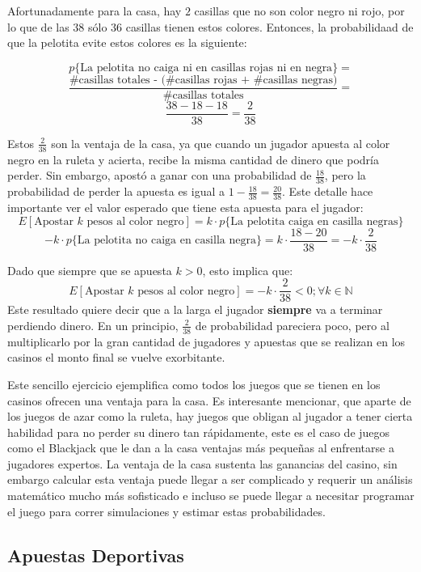 Afortunadamente para la casa, hay $2$ casillas que no son color negro ni rojo, por lo que de las $38$ sólo $36$ casillas tienen estos colores. Entonces, la probabilidaad de que la pelotita evite estos colores es la siguiente:

\[p\{\text{La pelotita no caiga ni en casillas rojas ni en negra}\} =\] 
\[\frac{\text{\# casillas totales - (\# casillas rojas + \# casillas negras)}}{ \text{\# casillas totales}}  =\]
\[\frac{38-18-18}{38} = \frac{2}{38}  \]

Estos $\frac{2}{38}$ son la ventaja de la casa, ya que cuando un jugador apuesta al color negro en la ruleta y acierta, recibe la misma cantidad de dinero que podría perder. Sin embargo, apostó a ganar con una probabilidad de $\frac{18}{38}$, pero la probabilidad de perder la apuesta es igual a $1 - \frac{18}{38} = \frac{20}{38}$. Este detalle hace importante ver el valor esperado que tiene esta apuesta para el jugador:
\[E[\text{Apostar }k\text{ pesos al color negro}] = k  \cdot   p\{\text{La pelotita caiga en casilla negras}\} \]
\[- k  \cdot   p\{\text{La pelotita no caiga en casilla negra}\} = k \cdot \frac{18-20}{38}= - k \cdot \frac{2}{38}\]

Dado que siempre que se apuesta $k>0$, esto implica que:
\[E[\text{Apostar }k\text{ pesos al color negro}] = - k \cdot \frac{2}{38} < 0; \forall k \in \mathbb{N} \]
Este resultado quiere decir que a la larga el jugador \textbf{siempre} va a terminar perdiendo dinero.
En un principio, $\frac{2}{38}$ de probabilidad pareciera poco, pero al multiplicarlo por la gran cantidad de jugadores y apuestas que se realizan en los casinos el monto final se vuelve exorbitante.

Este sencillo ejercicio ejemplifica como todos los juegos que se tienen en los casinos ofrecen una ventaja para la casa. Es interesante mencionar, que aparte de los juegos de azar como la ruleta, hay juegos que obligan al jugador a tener cierta habilidad para no perder su dinero tan rápidamente, este es el caso de juegos como el Blackjack que le dan a la casa ventajas más pequeñas al enfrentarse a jugadores expertos. La ventaja de la casa sustenta las ganancias del casino, sin embargo calcular esta ventaja puede llegar a ser  complicado y requerir un análisis matemático mucho más sofisticado e incluso se puede llegar a necesitar programar el juego para correr simulaciones y estimar estas probabilidades.

\subsection{Apuestas Deportivas}

